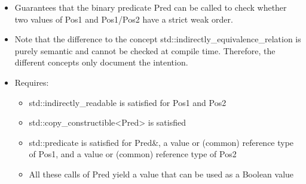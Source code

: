 \begin{itemize}
\item
Guarantees that the binary predicate Pred can be called to check whether two values of Pos1 and Pos1/Pos2 have a strict weak order.

\item
Note that the difference to the concept std::indirectly\_equivalence\_relation is purely semantic and cannot be checked at compile time. Therefore, the different concepts only document the intention.

\item
Requires:
\begin{itemize}
\item
std::indirectly\_readable is satisfied for Pos1 and Pos2

\item
std::copy\_constructible<Pred> is satisfied

\item
std::predicate is satisfied for Pred\&, a value or (common) reference type of Pos1, and a value or (common) reference type of Pos2

\item
All these calls of Pred yield a value that can be used as a Boolean value
\end{itemize}
\end{itemize}











